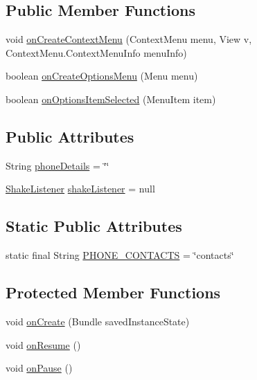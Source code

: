 \subsection*{Public Member Functions}
\begin{DoxyCompactItemize}
\item 
void \hyperlink{classcourse_1_1examples_1_1phoneapp_1_1_main_activity_af3dc2bc280622bf4e9a9217b6c517c3d}{on\+Create\+Context\+Menu} (Context\+Menu menu, View v, Context\+Menu.\+Context\+Menu\+Info menu\+Info)
\item 
boolean \hyperlink{classcourse_1_1examples_1_1phoneapp_1_1_main_activity_a2c707af1c10b6bc00cd1381a5b194915}{on\+Create\+Options\+Menu} (Menu menu)
\item 
boolean \hyperlink{classcourse_1_1examples_1_1phoneapp_1_1_main_activity_ae80d1d5e00c746d7cb82860483b3ad0c}{on\+Options\+Item\+Selected} (Menu\+Item item)
\end{DoxyCompactItemize}
\subsection*{Public Attributes}
\begin{DoxyCompactItemize}
\item 
String \hyperlink{classcourse_1_1examples_1_1phoneapp_1_1_main_activity_a2e49349c76e07dceda2b968b25b2f12e}{phone\+Details} = \char`\"{}\char`\"{}
\item 
\hyperlink{classcourse_1_1examples_1_1phoneapp_1_1_shake_listener}{Shake\+Listener} \hyperlink{classcourse_1_1examples_1_1phoneapp_1_1_main_activity_a7e9ef0d32b848b4c425981d38bef06fd}{shake\+Listener} = null
\end{DoxyCompactItemize}
\subsection*{Static Public Attributes}
\begin{DoxyCompactItemize}
\item 
static final String \hyperlink{classcourse_1_1examples_1_1phoneapp_1_1_main_activity_a60a240e7bcd23f7fa0b2c9e78d19fffb}{P\+H\+O\+N\+E\+\_\+\+C\+O\+N\+T\+A\+C\+T\+S} = \char`\"{}contacts\char`\"{}
\end{DoxyCompactItemize}
\subsection*{Protected Member Functions}
\begin{DoxyCompactItemize}
\item 
void \hyperlink{classcourse_1_1examples_1_1phoneapp_1_1_main_activity_a070a6d5a698190ad3ccd4029ef0de81c}{on\+Create} (Bundle saved\+Instance\+State)
\item 
void \hyperlink{classcourse_1_1examples_1_1phoneapp_1_1_main_activity_ae4569b54396b85ca3b2970233bce7101}{on\+Resume} ()
\item 
void \hyperlink{classcourse_1_1examples_1_1phoneapp_1_1_main_activity_adb371d3f3911466d2029203a484bc383}{on\+Pause} ()
\end{DoxyCompactItemize}


